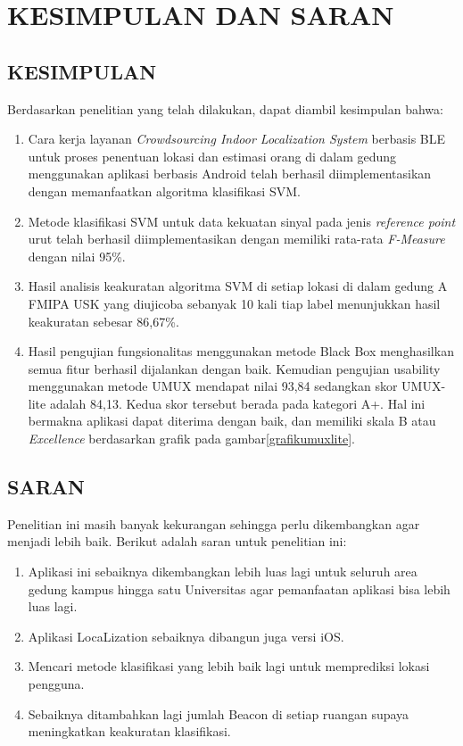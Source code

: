 \fancyhf{}
\fancyfoot[C]{\thepage}
\chapter{KESIMPULAN DAN SARAN}

\section{\uppercase{KESIMPULAN}}
Berdasarkan penelitian yang telah dilakukan, dapat diambil kesimpulan bahwa:
\begin{enumerate}
	\item Cara kerja layanan \textit{Crowdsourcing Indoor Localization System} berbasis BLE untuk proses penentuan lokasi dan estimasi orang di dalam gedung menggunakan aplikasi berbasis Android telah berhasil diimplementasikan dengan memanfaatkan algoritma klasifikasi SVM.
	\item Metode klasifikasi SVM untuk data kekuatan sinyal pada jenis \textit{reference point} urut telah berhasil diimplementasikan dengan memiliki rata-rata \textit{F-Measure} dengan nilai 95\%.
	\item Hasil analisis keakuratan algoritma SVM di setiap lokasi di dalam gedung A FMIPA USK yang diujicoba sebanyak 10 kali tiap label menunjukkan hasil keakuratan sebesar 86,67\%.
	\item Hasil pengujian fungsionalitas menggunakan metode Black Box menghasilkan semua fitur berhasil dijalankan dengan baik. Kemudian pengujian usability menggunakan metode UMUX mendapat nilai 93,84 sedangkan skor UMUX-lite adalah 84,13. Kedua skor tersebut berada pada kategori A+. Hal ini bermakna aplikasi dapat diterima dengan baik, dan memiliki skala B atau \textit{Excellence} berdasarkan grafik pada gambar\ref{grafikumuxlite}.
\end{enumerate}



\section{\uppercase{SARAN}}

Penelitian ini masih banyak kekurangan sehingga perlu dikembangkan agar menjadi lebih baik. Berikut adalah saran untuk penelitian ini:
\begin{enumerate}
	\item Aplikasi ini sebaiknya dikembangkan lebih luas lagi untuk seluruh area gedung kampus hingga satu Universitas agar pemanfaatan aplikasi bisa lebih luas lagi.
	\item Aplikasi LocaLization sebaiknya dibangun juga  versi iOS.
	\item Mencari metode klasifikasi yang lebih baik lagi untuk memprediksi lokasi pengguna.
	\item Sebaiknya ditambahkan lagi jumlah Beacon di setiap ruangan supaya meningkatkan keakuratan klasifikasi.

\end{enumerate}

\fancyhf{}
\fancyfoot[R]{\thepage}
\begin{comment}

\end{comment}
